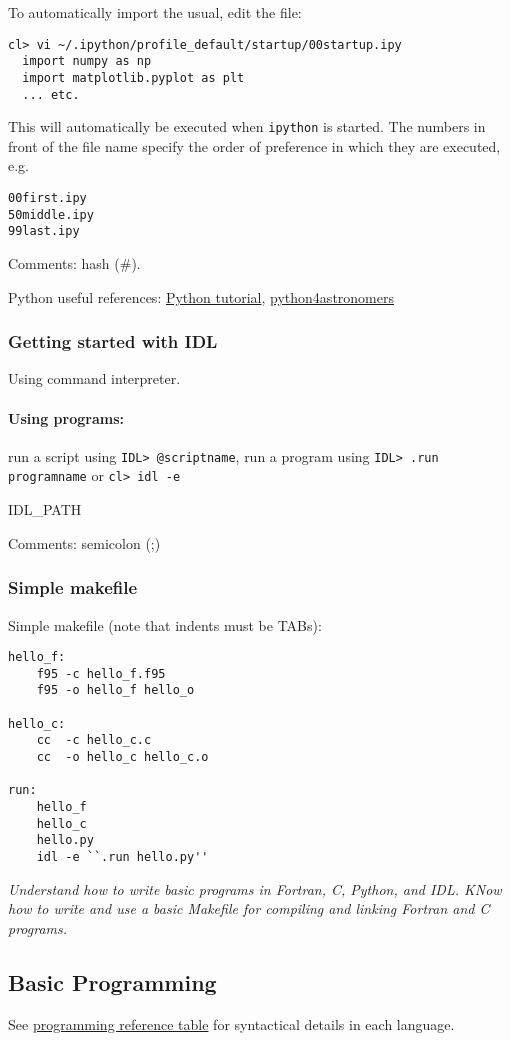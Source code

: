 \documentclass{article}
\newcommand{\test}[1]{%
    \begin{center}
        \colorbox{hl}{\parbox{0.9\textwidth}{\emph{\centering #1}}}
    \end{center}}
\begin{document}
To automatically import the usual, edit the file:
\begin{verbatim}
cl> vi ~/.ipython/profile_default/startup/00startup.ipy
  import numpy as np
  import matplotlib.pyplot as plt
  ... etc.
\end{verbatim}
This will automatically be executed when \verb|ipython| is started.
The numbers in front of the file name specify the order of preference
in which they are executed, e.g.\
\begin{verbatim}
00first.ipy
50middle.ipy
99last.ipy
\end{verbatim}

Comments: hash (\#).

Python useful references: \href{http://www.python-course.eu/course.php}
{Python tutorial},
\href{https://python4astronomers.github.io}{python4astronomers}


\subsubsection{Getting started with IDL}
Using command interpreter.
\paragraph{Using programs:}
run a script using \verb|IDL> @scriptname|, run a program using
\verb|IDL> .run programname| or
\verb|cl> idl -e|

IDL\_PATH

Comments: semicolon (;)
\subsubsection{Simple makefile}
Simple makefile (note that indents must be TABs):

\begin{verbatim}
hello_f:
    f95 -c hello_f.f95
    f95 -o hello_f hello_o

hello_c:
    cc  -c hello_c.c
    cc  -o hello_c hello_c.o

run:
    hello_f
    hello_c
    hello.py
    idl -e ``.run hello.py''
\end{verbatim}

\test{Understand how to write basic programs in Fortran, C,
Python, and IDL. KNow how to write and use a basic Makefile for
compiling and linking Fortran and C programs.}

\subsection{Basic Programming}
See \href{http://astronomy.nmsu.edu/holtz/a575/programming.html}
{programming reference table} for syntactical details in each
language.
\end{document}
